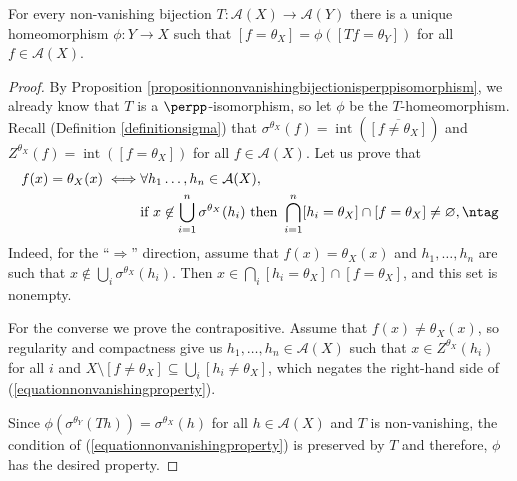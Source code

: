 \begin{theorem}\label{theoremnonvanishing}
For every non-vanishing bijection $T:\mathcal{A}(X)\to\mathcal{A}(Y)$ there is a unique homeomorphism $\phi:Y\to X$ such that $[f=\theta_X]=\phi([Tf=\theta_Y])$ for all $f\in\mathcal{A}(X)$.
\end{theorem}
\begin{proof}
By Proposition \ref{propositionnonvanishingbijectionisperppisomorphism}, we already know that $T$ is a $\perpp$-isomorphism, so let $\phi$ be the $T$-homeomorphism. Recall (Definition \ref{definitionsigma}) that $\sigma^{\theta_X}(f)=\operatorname{int}(\overline{[f\neq\theta_X]})$ and $Z^{\theta_X}(f)=\operatorname{int}([f=\theta_X])$ for all $f\in\mathcal{A}(X)$. Let us prove that
\begin{align*}
f(x)=\theta_X(x)\iff&\forall h_1\ldots,h_n\in\mathcal{A}(X),\\
&\text{if }x\not\in\bigcup_{i=1}^n\sigma^{\theta_X}(h_i)\text{ then }\bigcap_{i=1}^n[h_i=\theta_X]\cap[f=\theta_X]\neq\varnothing,\ntag\label{equationnonvanishingproperty}
\end{align*}
Indeed, for the ``$\Rightarrow$'' direction, assume that $f(x)=\theta_X(x)$ and $h_1,\ldots,h_n$ are such that $x\not\in\bigcup_i\sigma^{\theta_X}(h_i)$. Then $x\in\bigcap_i[h_i=\theta_X]\cap[f=\theta_X]$, and this set is nonempty.

For the converse we prove the contrapositive. Assume that $f(x)\neq\theta_X(x)$, so regularity and compactness give us $h_1,\ldots,h_n\in\mathcal{A}(X)$ such that $x\in Z^{\theta_X}(h_i)$ for all $i$ and $X\setminus[f\neq\theta_X]\subseteq\bigcup_i[h_i\neq\theta_X]$, which negates the right-hand side of (\ref{equationnonvanishingproperty}).

Since $\phi(\sigma^{\theta_Y}(Th))=\sigma^{\theta_X}(h)$ for all $h\in\mathcal{A}(X)$ and $T$ is non-vanishing, the condition of  (\ref{equationnonvanishingproperty}) is preserved by $T$ and therefore, $\phi$ has the desired property.\qedhere
\end{proof}